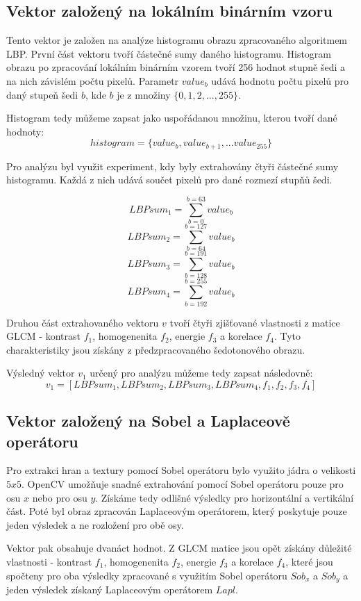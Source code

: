\subsection{Vektor založený na lokálním binárním vzoru}
Tento vektor je založen na analýze histogramu obrazu zpracovaného algoritmem LBP. První část vektoru tvoří částečné sumy daného histogramu. Histogram obrazu po zpracování lokálním binárním vzorem tvoří 256 hodnot stupně šedi a na nich závislém počtu pixelů. Parametr $value_b$ udává hodnotu počtu pixelů pro daný stupeň šedi $b$, kde $b$ je z množiny $\{0,1,2,...,255\}$.

Histogram tedy můžeme zapsat jako uspořádanou množinu, kterou tvoří dané hodnoty:
$$histogram = \{value_b, value_{b+1}, ... value_{255}\}$$

Pro analýzu byl využit experiment, kdy byly extrahovány čtyři částečné sumy histogramu. Každá z nich udává součet pixelů pro dané rozmezí stupňů šedi.

$$LBPsum_1 = \sum_{b=0}^{b=63} value_b $$
$$LBPsum_2 = \sum_{b=64}^{b=127} value_b $$
$$LBPsum_3 = \sum_{b=128}^{b=191} value_b $$
$$LBPsum_4 = \sum_{b=192}^{b=255} value_b $$

Druhou část extrahovaného vektoru $v$ tvoří čtyři zjišťované vlastnosti z matice GLCM - kontrast $f_1$, homogenenita $f_2$, energie $f_3$ a korelace $f_4$. Tyto charakteristiky jsou získány z předzpracovaného šedotonového obrazu.

Výsledný vektor $v_1$ určený pro analýzu můžeme tedy zapsat následovně:
$$v_1 = [LBPsum_1, LBPsum_2, LBPsum_3, LBPsum_4, f_1, f_2, f_3, f_4]$$

\subsection{Vektor založený na Sobel a Laplaceově operátoru}
Pro extrakci hran a textury pomocí Sobel operátoru bylo využito jádra o velikosti $5x5$. OpenCV umožňuje snadné extrahování pomocí Sobel operátoru pouze pro osu $x$ nebo pro osu $y$. Získáme tedy odlišné výsledky pro horizontální a vertikální část. Poté byl obraz zpracován Laplaceovým operátorem, který poskytuje pouze jeden výsledek a ne rozložení pro obě osy. 

Vektor pak obsahuje dvanáct hodnot. Z GLCM matice jsou opět získány důležité vlastnosti - kontrast $f_1$, homogenenita $f_2$, energie $f_3$ a korelace $f_4$, které jsou spočteny pro oba výsledky zpracované s využitím Sobel operátoru $Sob_x$ a $Sob_y$ a jeden výsledek získaný Laplaceovým operátorem $Lapl$.

